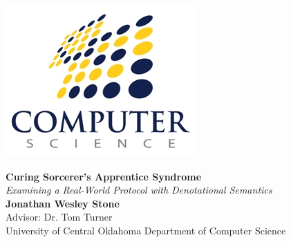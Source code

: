 \documentclass[a0,landscape]{a0poster}
\begin{document}

\begin{figure}[!htb]
\begin{minipage}[b]{0.19\linewidth}
\includegraphics[height=.8\columnwidth,keepaspectratio]{csdept_logo.png} %
\end{minipage}
%
\hspace{9cm}
\begin{minipage}[b]{0.59\linewidth}
\veryHuge \color{NavyBlue} \textbf{Curing Sorcerer's Apprentice Syndrome} \color{Black}\\ %
\Huge\textit{Examining a Real-World Protocol with Denotational Semantics}\\[1cm] %
\huge \textbf{Jonathan Wesley Stone}\\ %
\huge Advisor: Dr. Tom Turner\\
\huge University of Central Oklahoma Department of Computer Science\\ %
\end{minipage}
%
\begin{minipage}[b]{0.19\linewidth}

\end{minipage}
\end{figure}
\end{document}
